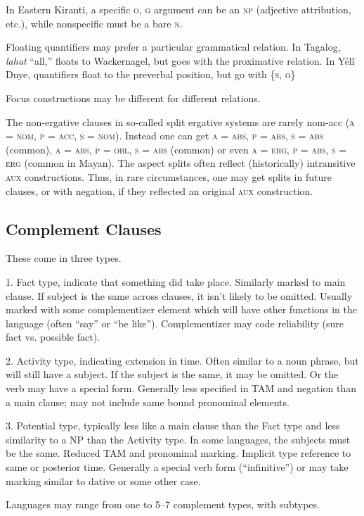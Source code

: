 \documentclass[11pt]{article}
\newcommand{\I}[1]{\textsc{#1}}   %
\begin{document}
In Eastern Kiranti, a specific \I{o, g} argument can be an \I{np}
(adjective attribution, etc.), while nonspecific must be a bare
\I{n}.

Floating quantifiers may prefer a particular grammatical relation.  In
Tagalog, \textit{lahat} ``all,'' floats to Wackernagel, but goes with
the proximative relation.  In Yélî Dnye, quantifiers float to the
preverbal position, but go with \{\I{s, o}\}

Focus constructions may be different for different relations.

The non-ergative clauses in so-called split ergative systems are
rarely nom-acc (\I{a = nom, p = acc, s = nom}).  Instead one can get
\I{a = abs, p = abs, s = abs} (common), \I{a = abs, p = obl, s = abs}
(common) or even \I{a = erg, p = abs, s = erg} (common in Mayan).  The
aspect splits often reflect (historically) intransitive \I{aux}
constructions.  Thus, in rare circumstances, one may get splits in
future clauses, or with negation, if they reflected an original
\I{aux} construction.


\subsection{Complement Clauses}
These come in three types.

1.  Fact type, indicate that something did take place.  Similarly
marked to main clause.  If subject is the same across clauses, it
isn't likely to be omitted.  Usually marked with some complementizer
element which will have other functions in the language (often ``say''
or ``be like'').  Complementizer may code reliability (sure fact
vs. possible fact).

2. Activity type, indicating extension in time.  Often similar to a
noun phrase, but will still have a subject.  If the subject is the
same, it may be omitted.  Or the verb may have a special form.
Generally less specified in TAM and negation than a main clause; may
not include same bound pronominal elements.

3. Potential type, typically less like a main clause than the Fact
type and less similarity to a NP than the Activity type.  In some
languages, the subjects must be the same.  Reduced TAM and pronominal
marking.  Implicit type reference to same or posterior time.
Generally a special verb form (``infinitive'') or may take marking
similar to dative or some other case.

Languages may range from one to 5--7 complement types, with subtypes.
\end{document}
